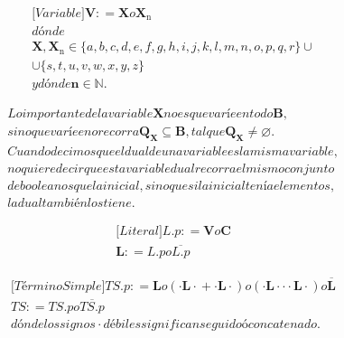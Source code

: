 \begin{enumerate}
\begin{enumerate}
\begin{enumerate}
\begin{enumerate}
        \[\begin{matrix}
        {{\lbrack\mathbf{\mathit{Variable}}\rbrack}\mathbf{V}{: =}\mathbf{X}o\mathbf{X_{\mathrm{n}}}} \\
        \mathit{dónde} \\
        {\mathbf{X},{\mathbf{X_{\mathrm{n}}} \in {{\{{a,b,c,d,e,f,g,h,i,j,k,l,m,n,o,p,q,r}\}} \cup}}} \\
        {{\cup {\{{s,t,u,v,w,x,y,z}\}}}\phantom{\{\}}} \\
        {y\mathit{dónde}\mathbf{n}{\in}\mathbf{\mathbb{N}}.}
        \end{matrix}\]

        \[\begin{matrix}
        {\mathit{Lo}\mathit{importante}\mathit{de}\mathit{la}\mathit{variable}\mathbf{X}\mathit{no}\mathit{es}\mathit{que}\mathit{varíe}\mathit{en}\mathit{todo}\mathbf{B},} \\
        {\mathit{sino}\mathit{que}\mathit{varíe}\mathit{en}o\mathit{recorra}{\mathbf{Q_{X}} \subseteq \mathbf{B}},\mathit{tal}\mathit{que}{\mathbf{Q_{X}} \neq \varnothing}.} \\
        {\mathit{Cuando}\mathit{decimos}\mathit{que}\mathit{el}\mathit{dual}\mathit{de}\mathit{una}\mathit{variable}\mathit{es}\mathit{la}\mathit{misma}\mathit{variable},} \\
        {\mathit{no}\mathit{quiere}\mathit{decir}\mathit{que}\mathit{esta}\mathit{variable}\mathit{dual}\mathit{recorra}\mathit{el}\mathit{mismo}\mathit{conjunto}} \\
        {\mathit{de}\mathit{booleanos}\mathit{que}\mathit{la}\mathit{inicial},\mathit{sino}\mathit{que}\mathit{si}\mathit{la}\mathit{inicial}\mathit{tenía}\mathit{elementos},} \\
        {\mathit{la}\mathit{dual}\mathit{también}\mathit{los}\mathit{tiene.}}
        \end{matrix}\]

        \[\begin{matrix}
        {{\lbrack\mathbf{\mathit{Literal}}\rbrack}\mathbf{\mathit{L.p}}{: =}\mathbf{V}o\mathbf{C}} \\
        {\mathbf{L}{: =}\mathbf{\mathit{L.p}}o\overline{\mathbf{\mathit{L.p}}}}
        \end{matrix}\]

        \[\begin{matrix}
        {{\lbrack\mathbf{\mathit{Término}\mathit{Simple}}\rbrack}\mathbf{\mathit{TS.p}}{: =}\mathbf{L}o\left( {{{\cdot \mathbf{L}} \cdot} + {{\cdot \mathbf{L}} \cdot}} \right)o\left( {{{{\cdot \mathbf{L}} \cdot \mathbf{\mathrm{\cdot}}} \cdot \mathbf{L}} \cdot} \right)o\overline{\mathbf{L}}} \\
        {\mathbf{\mathit{TS}}{: =}\mathbf{\mathit{TS.p}}o\mathbf{\overline{\mathit{TS.p}}}} \\
        {\mathit{dónde}\mathit{los}\mathit{signos} \cdot \mathit{débiles}\mathit{significan}\mathit{seguido}ó\mathit{concatenado.}}
        \end{matrix}\]


\end{enumerate}
\end{enumerate}
\end{enumerate}
\end{enumerate}
